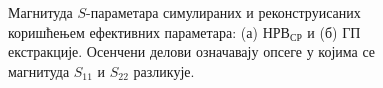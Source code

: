 \begin{figure}[!t]
\centering
{}
\caption{Магнитуда $S$-параметара симулираних и реконструисаних коришћењем ефективних параметара: (а) $НРВ_{СР}$ и (б) ГП екстракције. Осенчени делови означавају опсеге у којима се магнитуда $S_{11}$ и $S_{22}$ разликује.}
\label{val_pod90_mag}
\end{figure}

